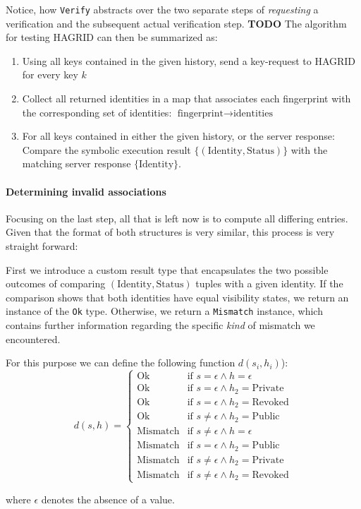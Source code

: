 
Notice, how \texttt{Verify} abstracts over the two separate steps of \emph{requesting} a verification and the subsequent actual verification step.
\textbf{TODO}
The algorithm for testing HAGRID can then be summarized as: 
\begin{enumerate}
    \item Using all keys contained in the given history, send a key-request to HAGRID for every key $k$
    \item Collect all returned identities in a map that associates each fingerprint with the corresponding set of identities: $ \text{fingerprint} \rightarrow \text{identities}$
    \item\label{sec:comp_hagrid} For all keys contained in either the given history, or the server response: Compare the symbolic execution result $\{(\text{Identity},\text{Status})\}$ with the matching server response $\{\text{Identity}\}$.
\end{enumerate}

\paragraph{Determining invalid associations}
Focusing on the last step, all that is left now is to compute all differing entries. Given that the format of both structures is very similar, this process is very straight forward: 

First we introduce a custom result type that encapsulates the two possible outcomes of comparing $(\text{Identity},\text{Status})$ tuples with a given identity. If the comparison shows that both identities have equal visibility states, we return an instance of the \texttt{Ok} type. Otherwise, we return a \texttt{Mismatch} instance, which contains further information regarding the specific \emph{kind} of mismatch we encountered. 

 For this purpose we can define the following function \(d(s_i,h_i)\)): 
\[
    d(s,h) = \begin{cases}
        \text{Ok} & \text{if } s = \epsilon \wedge h = \epsilon \\
        \text{Ok} & \text{if } s = \epsilon \wedge h_2 = \text{Private} \\
        \text{Ok} & \text{if } s = \epsilon \wedge h_2 = \text{Revoked} \\
        \text{Ok} & \text{if } s \neq \epsilon \wedge h_2 = \text{Public} \\

        \text{Mismatch} & \text{if } s \neq \epsilon \wedge h = \epsilon \\
        \text{Mismatch} & \text{if } s = \epsilon \wedge h_2 = \text{Public} \\
        \text{Mismatch} & \text{if } s \neq \epsilon \wedge h_2 = \text{Private} \\
        \text{Mismatch} & \text{if } s \neq \epsilon \wedge h_2 = \text{Revoked} 
    \end{cases}    
\]

where \(\epsilon\) denotes the absence of a value.

